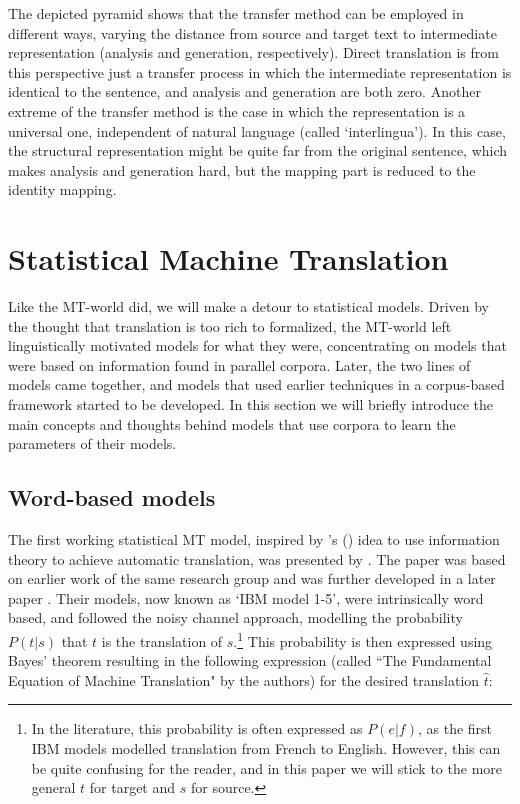 \documentclass{report}
\theoremstyle{definition}
\theoremstyle{plain}
\def\citepos#1{\citeauthor{#1}'s (\citeyear{#1})}
\begin{document}
The depicted pyramid shows that the transfer method can be employed in different ways, varying the distance from source and target text to intermediate representation (analysis and generation, respectively). Direct translation is from this perspective just a transfer process in which the intermediate representation is identical to the sentence, and analysis and generation are both zero. Another extreme of the transfer method is the case in which the representation is a universal one, independent of natural language (called `interlingua'). In this case, the structural representation might be quite far from the original sentence, which makes analysis and generation hard, but the mapping part is reduced to the identity mapping.

\section{Statistical Machine Translation}
\label{sec:SMT}

Like the MT-world did, we will make a detour to statistical models. Driven by the thought that translation is too rich to formalized, the MT-world left linguistically motivated models for what they were, concentrating on models
that were based on information found in parallel corpora. Later, the two lines of models came together, and models that used earlier techniques in a corpus-based framework started to be developed. In this section we will briefly introduce the main concepts and thoughts behind models that use corpora to learn the parameters of their models.

\subsection{Word-based models}
The first working statistical MT model, inspired by \citepos{weaver1955translation} idea to use information theory to achieve automatic translation, was presented by \cite{brown1990statistical}. The paper was based on earlier work of the same research group \citep{brown1988statistical} and was further developed in a later paper \citep{brown1993mathematics}. Their models, now known as `IBM model 1-5', were intrinsically word based, and followed the noisy channel approach, modelling the probability $P(t|s)$ that $t$ is the translation of $s$.\footnote{In the literature, this probability is often expressed as $P(e|f)$, as the first IBM models modelled translation from French to English. However, this can be quite confusing for the reader, and in this paper we will stick to the more general $t$ for target and $s$ for source.} This probability is then expressed using Bayes' theorem resulting in the following expression (called ``The Fundamental Equation of Machine Translation" by the authors) for the desired translation $\hat{t}$:
\end{document}
